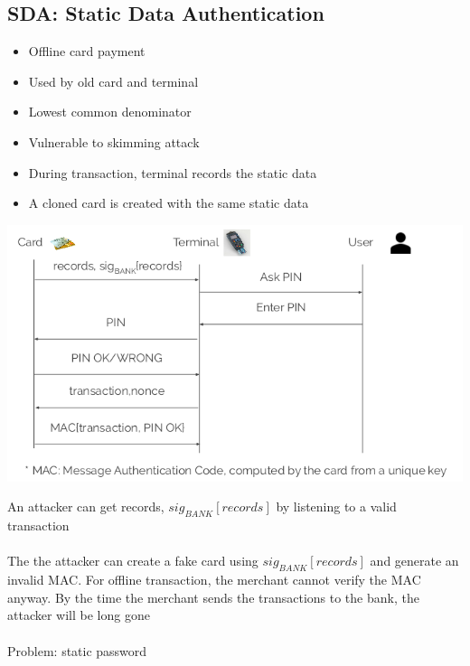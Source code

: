 \documentclass{article}[18pt]
\begin{document}
\subsection{SDA: Static Data Authentication}
\begin{itemize}
	\item Offline card payment
	\item Used by old card and terminal
	\item Lowest common denominator
	\item Vulnerable to skimming attack
	\item During transaction, terminal records the static data
	\item A cloned card is created with the same static data
\end{itemize}
\begin{center}
	\includegraphics[scale=0.7]{EMV}
\end{center}
An attacker can get records, $sig_{BANK}[records]$ by listening to a valid transaction\\
\\
The the attacker can create a fake card using $sig_{BANK}[records]$ and generate an invalid MAC. For offline transaction, the merchant cannot verify the MAC anyway. By the time the merchant sends the transactions to the bank, the attacker will be long gone\\
\\
Problem: static password
\end{document}
